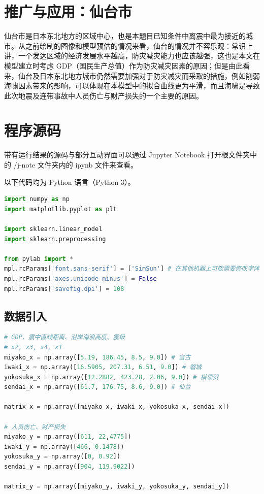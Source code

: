 \documentclass[UTF8]{ctexart}
\begin{document}
\section{推广与应用：仙台市}
仙台市是日本东北地方的区域中心，也是本题目已知条件中离震中最为接近的城市。从之前绘制的图像和模型预估的情况来看，仙台的情况并不容乐观：常识上讲，一个发达区域的经济发展水平越高，防灾减灾能力也应该越强，这也是本文在模型建立时考虑 GDP（国民生产总值）作为防灾减灾因素的原因；但是由此看来，仙台及日本东北地方城市仍然需要加强对于防灾减灾而采取的措施，例如削弱海啸因素带来的影响，可以体现在本模型中的拟合曲线更为平滑，而且海啸是导致此次地震及连带事故中人员伤亡与财产损失的一个主要的原因。



\clearpage
\appendix
\appendixname
\section{程序源码}
带有运行结果的源码与部分互动界面可以通过 Jupyter Notebook 打开根文件夹中的 /j-note 文件夹内的 ipynb 文件来查看。

以下代码均为 Python 语言（Python 3）。

\begin{lstlisting}[language=Python]
import numpy as np
import matplotlib.pyplot as plt

import sklearn.linear_model
import sklearn.preprocessing

from pylab import *  
mpl.rcParams['font.sans-serif'] = ['SimSun'] # 在其他机器上可能需要修改字体名
mpl.rcParams['axes.unicode_minus'] = False
mpl.rcParams['savefig.dpi'] = 108
\end{lstlisting}

\subsection{数据引入}
\begin{lstlisting}[language=Python]
# GDP、震中直线距离、沿岸海浪高度、震级
# x2, x3, x4, x1
miyako_x = np.array([5.19, 186.45, 8.5, 9.0]) # 宫古
iwaki_x = np.array([16.5905, 207.31, 6.51, 9.0]) # 磐城
yokosuka_x = np.array([12.2882, 423.28, 2.06, 9.0]) # 横须贺
sendai_x = np.array([61.7, 176.75, 8.6, 9.0]) # 仙台

matrix_x = np.array([miyako_x, iwaki_x, yokosuka_x, sendai_x])

# 人员伤亡、财产损失
miyako_y = np.array([611, 22,4775])
iwaki_y = np.array([466, 0.1478])
yokosuka_y = np.array([0, 0.92])
sendai_y = np.array([904, 119.9022])

matrix_y = np.array([miyako_y, iwaki_y, yokosuka_y, sendai_y])
\end{lstlisting}
\end{document}
